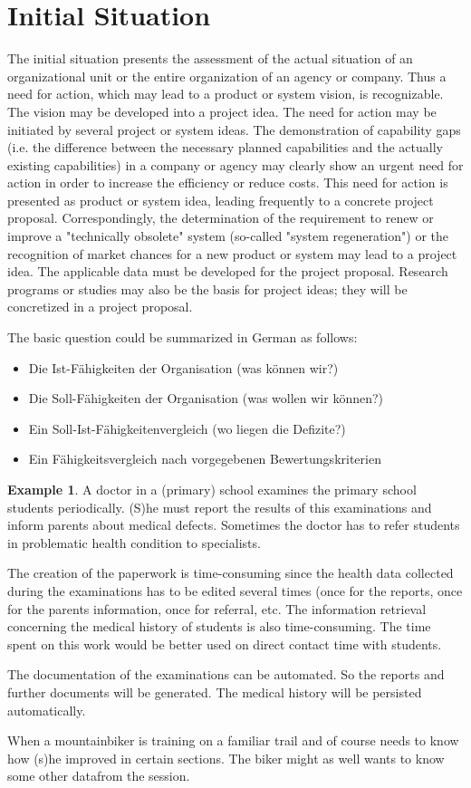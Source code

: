 \documentclass[12pt]{article}
\theoremstyle{definition}
\newtheorem{example}{Example}
\newenvironment{explanation}{%
   \setlength{\parindent}{0pt}
   \itshape
   \color{blue}
}{}
\begin{document}
\section{Initial Situation}
\begin{explanation}
The initial situation presents the assessment of the actual situation of an organizational unit or the entire organization of an agency or company. Thus a need for action, which may lead to a product or system vision, is recognizable. The vision may be developed into a project idea. The need for action may be initiated by several project or system ideas.
The demonstration of capability gaps (i.e. the difference between the necessary planned capabilities and the actually existing capabilities) in a company or agency may clearly show an urgent need for action in order to increase the efficiency or reduce costs. This need for action is presented as product or system idea, leading frequently to a concrete project proposal. Correspondingly, the determination of the requirement to renew or improve a "technically obsolete" system (so-called "system regeneration") or the recognition of market chances for a new product or system may lead to a project idea. The applicable data must be developed for the project proposal.
Research programs or studies may also be the basis for project ideas; they will be concretized in a project proposal.

The basic question could be summarized in German as follows:
\begin{itemize}
	\item Die Ist-Fähigkeiten der Organisation (was können wir?)
	\item Die Soll-Fähigkeiten der Organisation (was wollen wir können?)
	\item Ein Soll-Ist-Fähigkeitenvergleich (wo liegen die Defizite?)
	\item Ein Fähigkeitsvergleich nach vorgegebenen Bewertungskriterien
\end{itemize}
\end{explanation}

\begin{example}
A doctor in a (primary) school examines the primary school students periodically. (S)he must report the results of this examinations and inform parents about medical defects. Sometimes the doctor has to refer students in problematic health condition to specialists.

The creation of the paperwork is time-consuming since the health data collected during the examinations has to be edited several times (once for the reports, once for the parents information, once for referral, etc. The information retrieval concerning the medical history of students is also time-consuming. The time spent on this work would be better used on direct contact time with students.

The documentation of the examinations can be automated. So the reports and further documents will be generated. The medical history will be persisted automatically.
\end{example}
When a mountainbiker is training on a familiar trail and of course needs to know how (s)he improved in certain sections. The biker might as well wants to know some other datafrom the session. 
\end{document}
